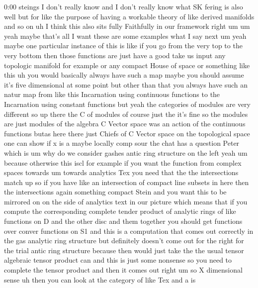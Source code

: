 \begin{unfinished}{0:00}
steings  I  don't  really  know  and  I  don't
really  know  what  SK  fering  is  also
well  but  for  like  the  purpose  of  having
a  workable  theory  of  like  derived
manifolds  and  so  on  uh  I  think  this  also
sits  fully  Faithfully  in  our
framework  right  um
um  yeah  maybe  that's  all  I
want  these  are  some  examples  what  I  say
next
um  yeah  maybe  one  particular  instance  of
this  is  like  if  you  go  from  the  very  top
to  the  very  bottom  then  those  functions
are  just  have  a  good  take  us  input  any
topologic  manifold  for  example  or  any
compact  House  of  space  or  something  like
this  uh  you  would  basically  always  have
such  a  map  maybe  you  should  assume  it's
five  dimensional  at  some  point  but  other
than  that  you  always  have  such  an  natur
map  from  like  this  Incarnation  using
continuous  functions  to  the  Incarnation
using  constant
functions  but  yeah  the  categories  of
modules  are  very  different  so  up  there
the  C  of  modules  of  course  just  the  it's
fine  so  the  modules  are  just  modules  of
the
algebra  C  Vector  space  was  an  action  of
the  continuous  functions  butas  here
there  just  Chiefs  of  C  Vector  space  on
the  topological
space  one  can
show  if  x  is  a  maybe  locally  comp
sour  the  chat  has  a  question  Peter  which
is  um  why  do  we  consider  gashes  antic
ring  structure  on  the
left
yeah
um  because  otherwise  this  iscl  for
example  if  you  want  the  function  from
complex  spaces  towards  um
towards  analytics  Tex  you  need  that  the
the  intersections  match  up  so  if  you
have  like  an  intersection  of  compact
line  subsets  in  here  then  the
intersections  again  something  compact
Stein  and  you  want  this  to  be  mirrored
on  on  the  side  of  analytics  text  in  our
picture  which  means  that  if  you  compute
the  corresponding  complete  tender
product  of  analytic  rings  of  like
functions  on  D  and  the  other  disc  and
them  together  you  should  get  functions
over  conver  functions  on  S1  and  this  is
a  computation  that  comes  out  correctly
in  the  gas  analytic  ring  structure  but
definitely  doesn't  come  out  for  the
right  for  the  trial  antic  ring  structure
because  then  would  just  take  the  the
usual  tensor  algebraic  tensor  product
can  and  this  is  just  some  nonsense  so
you  need  to  complete  the  tensor  product
and  then  it  comes  out
right  um  so  X  dimensional  sense  uh
then  you  can  look  at  the  category  of
like
Tex  and  a  is

\end{unfinished}
